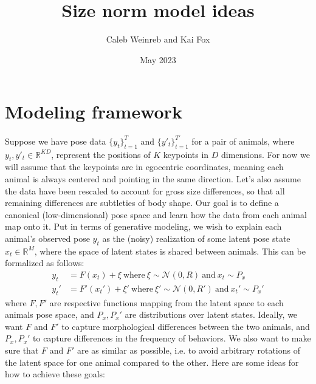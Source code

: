 \documentclass{article}         %
\title{Size norm model ideas}
\author{Caleb Weinreb and Kai Fox}
\date{May 2023}
\begin{document}
\maketitle

\section{Modeling framework}

Suppose we have pose data $\{y_t\}_{t=1}^T$ and $\{y'_t\}_{t=1}^{T'}$ for a pair of animals, where $y_t, y'_t \in \mathbb{R}^{KD}$, represent the positions of $K$ keypoints in $D$ dimensions. For now we will assume that the keypoints are in egocentric coordinates, meaning each animal is always centered and pointing in the same direction. Let's also assume the data have been rescaled to account for gross size differences, so that all remaining differences are subtleties of body shape. Our goal is to define a canonical (low-dimensional) pose space and learn how the data from each animal map onto it. Put in terms of generative modeling, we wish to explain each animal's observed pose $y_t$ as the (noisy) realization of some latent pose state $x_t \in \mathbb{R}^M$, where the space of latent states is shared between animals. This can be formalized as follows:
%
\begin{align}
    y_t & = F(x_t) + \xi \ \text{where} \ 
    \xi \sim \mathcal{N}(0, R) \ \text{and} \ 
    x_t \sim P_x \\
    y_t' & = F'(x_t') + \xi' \ \text{where} \ 
    \xi' \sim \mathcal{N}(0, R') \ \text{and} \ 
    x_t' \sim P_x'
\end{align}
%
where $F, F'$ are respective functions mapping from the latent space to each animals pose space, and $P_x, P_x'$ are distributions over latent states. Ideally, we want $F$ and $F'$ to capture morphological differences between the two animals, and $P_x, P_x'$ to capture differences in the frequency of behaviors. We also want to make sure that $F$ and $F'$ are as similar as possible, i.e. to avoid arbitrary rotations of the latent space for one animal compared to the other. Here are some ideas for how to achieve these goals:
\end{document}
